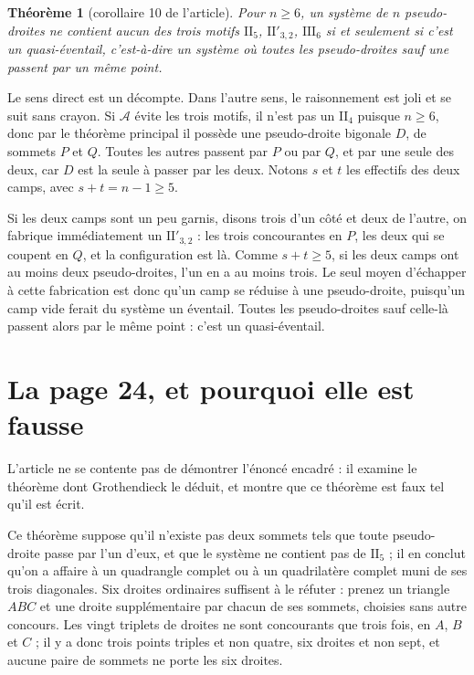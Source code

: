 \documentclass[11pt,a4paper]{amsart}
\theoremstyle{definition}
\theoremstyle{plain}
\newtheorem{theoreme}{Théorème}
\theoremstyle{remark}
\newcommand{\II}[1]{\mathrm{II}_{#1}}
\newcommand{\IIp}{\mathrm{II}'_{3,2}}
\newcommand{\III}{\mathrm{III}_{6}}
\newcommand{\A}{\mathcal A}
\begin{document}
\begin{theoreme}[corollaire 10 de l'article]
Pour $n \ge 6$, un système de $n$ pseudo-droites ne contient aucun des trois motifs $\II5$, $\IIp$, $\III$ si et seulement si c'est un \emph{quasi-éventail}, c'est-à-dire un système où toutes les pseudo-droites sauf une passent par un même point.
\end{theoreme}

Le sens direct est un décompte. Dans l'autre sens, le raisonnement est joli et se suit sans crayon. Si $\A$ évite les trois motifs, il n'est pas un $\II4$ puisque $n \ge 6$, donc par le théorème principal il possède une pseudo-droite bigonale $D$, de sommets $P$ et $Q$. Toutes les autres passent par $P$ ou par $Q$, et par une seule des deux, car $D$ est la seule à passer par les deux. Notons $s$ et $t$ les effectifs des deux camps, avec $s + t = n - 1 \ge 5$.

Si les deux camps sont un peu garnis, disons trois d'un côté et deux de l'autre, on fabrique immédiatement un $\IIp$ : les trois concourantes en $P$, les deux qui se coupent en $Q$, et la configuration est là. Comme $s + t \ge 5$, si les deux camps ont au moins deux pseudo-droites, l'un en a au moins trois. Le seul moyen d'échapper à cette fabrication est donc qu'un camp se réduise à une pseudo-droite, puisqu'un camp vide ferait du système un éventail. Toutes les pseudo-droites sauf celle-là passent alors par le même point : c'est un quasi-éventail.

\section{La page 24, et pourquoi elle est fausse}

L'article ne se contente pas de démontrer l'énoncé encadré : il examine le théorème dont Grothendieck le déduit, et montre que ce théorème est faux tel qu'il est écrit.

Ce théorème suppose qu'il n'existe pas deux sommets tels que toute pseudo-droite passe par l'un d'eux, et que le système ne contient pas de $\II5$ ; il en conclut qu'on a affaire à un quadrangle complet ou à un quadrilatère complet muni de ses trois diagonales. Six droites ordinaires suffisent à le réfuter : prenez un triangle $ABC$ et une droite supplémentaire par chacun de ses sommets, choisies sans autre concours. Les vingt triplets de droites ne sont concourants que trois fois, en $A$, $B$ et $C$ ; il y a donc trois points triples et non quatre, six droites et non sept, et aucune paire de sommets ne porte les six droites.
\end{document}
